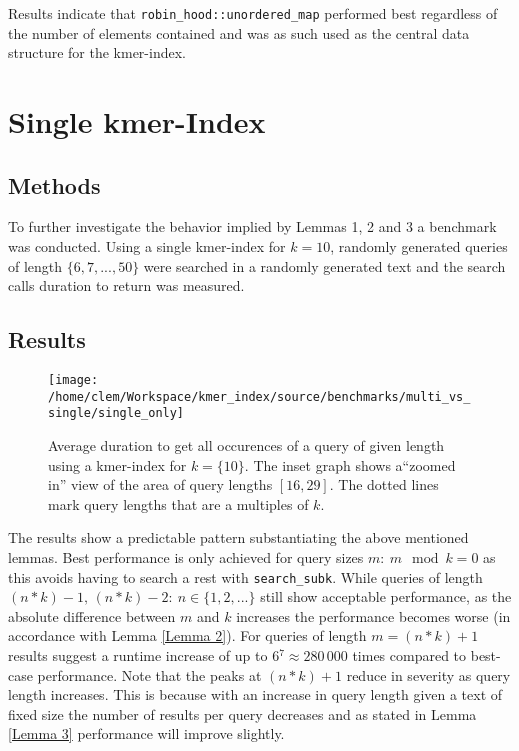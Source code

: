 Results indicate that \lstinline{robin_hood::unordered_map} performed
best regardless of the number of elements contained and was as such
used as the central data structure for the kmer-index.

\section{Single kmer-Index}
\subsection{Methods}
To further investigate the behavior implied by Lemmas 1, 2 and 3 a benchmark was conducted.
Using a single kmer-index for $k=10$, randomly generated queries of length $\{6,7,...,50\}$ were searched in a
randomly generated text and the search calls duration to return was measured.

\subsection{Results}
\begin{figure}[H]
\texttt{[image: /home/clem/Workspace/kmer\_index/source/benchmarks/multi\_vs\_single/single\_only]}

\caption{\label{figure 1}Average duration to get all occurences of a query
of given length using a kmer-index for $k=\{10\}$. The inset graph
shows a``zoomed in'' view of the area of query lengths $[16,29]$.
The dotted lines mark query lengths that are a multiples of $k$.}

\end{figure}

The results show a predictable pattern substantiating the above mentioned
lemmas. Best performance is only achieved for query sizes $m:\:m\mod k=0$
as this avoids having to search a rest with \lstinline{search_subk}.
While queries of length $(n*k)-1,\,(n*k)-2:\:n\in\{1,2,...\}$ still
show acceptable performance, as the absolute difference between $m$
and $k$ increases the performance becomes worse (in accordance with
Lemma \ref{Lemma 2}). For queries of length $m=(n*k)+1$ results suggest
a runtime increase of up to $6{{}^7}\approx280\,000$ times compared
to best-case performance. Note that the peaks at $(n*k)+1$ reduce
in severity as query length increases. This is because with an increase
in query length given a text of fixed size the number of results per
query decreases and as stated in Lemma \ref{Lemma 3} performance will
improve slightly.

